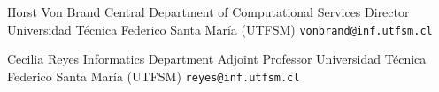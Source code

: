 \documentclass[12pt,a4paper]{moderncv}
\newcommand{\utfsm}{Universidad Técnica Federico Santa María (UTFSM)}
\begin{document}
\vspace{0.3cm}
    \cventry{}
            {Horst Von Brand}
            {Central Department of Computational Services Director}
            {{\utfsm}}
            {\texttt{vonbrand@inf.utfsm.cl}}
            {}

\vspace{0.3cm}
    \cventry{}
            {Cecilia Reyes}
            {Informatics Department Adjoint Professor}
            {{\utfsm}}
            {\texttt{reyes@inf.utfsm.cl}}
            {}

\vspace{0.8cm}
\nocite{*}

\renewcommand\refname{\LARGE Publications}

\end{document}
